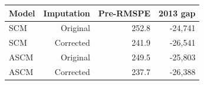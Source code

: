 \begin{tabular}{lrrr}
\toprule
Model & Imputation & Pre-RMSPE & 2013 gap \\
\midrule
SCM & Original & 252.8 & -24,741 \\
SCM & Corrected & 241.9 & -26,541 \\
ASCM & Original & 249.5 & -25,803 \\
ASCM & Corrected & 237.7 & -26,388 \\
\bottomrule
\end{tabular}
